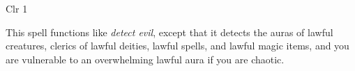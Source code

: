 
\begin{description*}
\item[Level:] Clr 1
\end{description*}

This spell functions like \textit{detect evil}, except that it detects the auras
of lawful creatures, clerics of lawful deities, lawful spells, and lawful magic
items, and you are vulnerable to an overwhelming lawful aura if you are chaotic.